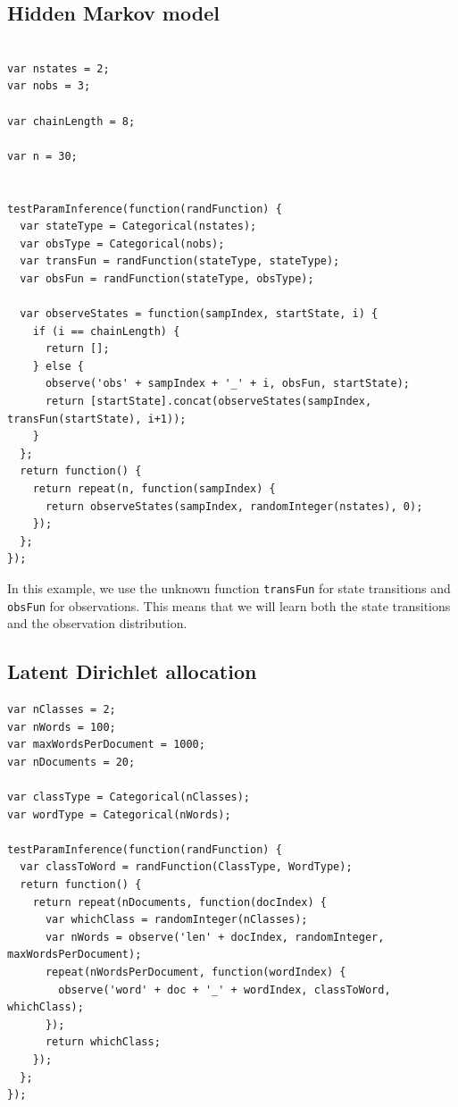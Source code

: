 \documentclass{article}
\begin{document}
  \subsection{Hidden Markov model}
{\small
\begin{verbatim}

var nstates = 2;
var nobs = 3;

var chainLength = 8;

var n = 30;


testParamInference(function(randFunction) {
  var stateType = Categorical(nstates);
  var obsType = Categorical(nobs);
  var transFun = randFunction(stateType, stateType);
  var obsFun = randFunction(stateType, obsType);

  var observeStates = function(sampIndex, startState, i) {
    if (i == chainLength) {
      return [];
    } else {
      observe('obs' + sampIndex + '_' + i, obsFun, startState);
      return [startState].concat(observeStates(sampIndex, transFun(startState), i+1));
    }
  };
  return function() {
    return repeat(n, function(sampIndex) {
      return observeStates(sampIndex, randomInteger(nstates), 0);
    });
  };
});
\end{verbatim}
}

In this example, we use the unknown function \texttt{transFun} for state transitions and \texttt{obsFun} for observations.  This means that we will learn both the state transitions and the observation distribution.


\subsection{Latent Dirichlet allocation}
{\small
\begin{verbatim}
var nClasses = 2;
var nWords = 100;
var maxWordsPerDocument = 1000;
var nDocuments = 20;

var classType = Categorical(nClasses);
var wordType = Categorical(nWords);

testParamInference(function(randFunction) {
  var classToWord = randFunction(ClassType, WordType);
  return function() {
    return repeat(nDocuments, function(docIndex) {
      var whichClass = randomInteger(nClasses);
      var nWords = observe('len' + docIndex, randomInteger, maxWordsPerDocument);
      repeat(nWordsPerDocument, function(wordIndex) {
        observe('word' + doc + '_' + wordIndex, classToWord, whichClass);
      });
      return whichClass;
    });
  };
});
\end{verbatim}
}
\end{document}
